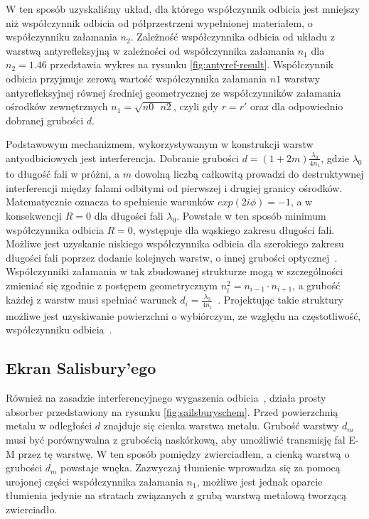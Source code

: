  W ten sposób uzyskaliśmy układ, dla którego współczynnik odbicia jest mniejszy niż współczynnik odbicia od półprzestrzeni wypełnionej materiałem, o współczynniku załamania $n_2$. Zależność współczynnika odbicia od układu z warstwą antyrefleksyjną w zależności od współczynnika załamania $n_1$ dla $n_2=1.46$ przedstawia wykres na rysunku \ref{fig:antyref-result}. Współczynnik odbicia przyjmuje zerową wartość współczynnika załamania $n1$ warstwy antyrefleksyjnej równej średniej geometrycznej ze współczynników załamania ośrodków zewnętrznych $n_1=\sqrt{n0\textrm{ }n2}$, czyli gdy $r=r'$ oraz dla odpowiednio dobranej grubości $d$.

Podstawowym mechanizmem, wykorzystywanym w konstrukcji warstw antyodbiciowych jest interferencja. Dobranie grubości $d=(1+2m)\frac{\lambda_0}{4 n_1}$, gdzie $\lambda_0$ to długość fali w próżni, a $m$ dowolną liczbą całkowitą prowadzi do destruktywnej interferencji między falami odbitymi od pierwszej i drugiej granicy ośrodków. Matematycznie oznacza to spełnienie warunków $exp(2 i \phi)=-1$, a w konsekwencji $R=0$ dla długości fali $\lambda_0$. Powstałe w ten sposób minimum współczynnika odbicia $R=0$, występuje dla wąskiego zakresu długości fali. Możliwe jest uzyskanie niskiego współczynnika odbicia dla szerokiego zakresu długości fali poprzez dodanie kolejnych warstw, o innej grubości optycznej~\cite{poitras2004toward}. Współczynniki załamania w tak zbudowanej strukturze mogą w szczególności zmieniać się zgodnie z postępem geometrycznym $n_i^2=n_{i-1} \cdot n_{i+1}$, a grubość każdej z warstw musi spełniać warunek $d_i=\frac{\lambda_0}{4 n_i}$~\cite{pochi1988optical}. Projektując takie struktury możliwe jest uzyskiwanie powierzchni o wybiórczym, ze względu na częstotliwość, współczynniku odbicia~\cite{monacelli2005infrared}. 

\subsection{Ekran Salisbury'ego}
Również na zasadzie interferencyjnego wygaszenia odbicia~\cite{us1952absorbent}, działa prosty absorber przedstawiony na rysunku \ref{fig:sailsburyschem}. Przed powierzchnią metalu w odległości $d$ znajduje się cienka warstwa metalu. Grubość warstwy $d_m$ musi być porównywalna z grubością naskórkową, aby umożliwić transmisję fal E-M przez tę warstwę. W ten sposób pomiędzy zwierciadłem, a cienką warstwą o grubości $d_m$ powstaje wnęka. Zazwyczaj tłumienie wprowadza się za pomocą urojonej części współczynnika załamania $n_1$, możliwe jest jednak oparcie tłumienia jedynie na stratach związanych z grubą warstwą metalową tworzącą zwierciadło. 

